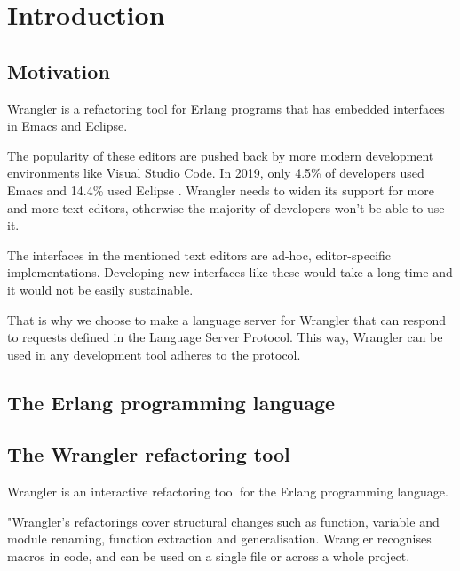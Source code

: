 \chapter{Introduction}
\label{ch:intro}


\section{Motivation}


Wrangler is a refactoring tool for Erlang programs that has embedded interfaces in Emacs and Eclipse.

The popularity of these editors are pushed back by more modern development environments like Visual Studio Code. In 2019, only 4.5\% of developers used Emacs and 14.4\% used Eclipse \cite{DevSurvey}. Wrangler needs to widen its support for more and more text editors, otherwise the majority of developers won’t be able to use it.

The interfaces in the mentioned text editors are ad-hoc, editor-specific implementations. 
Developing new interfaces like these would take a long time and it would not be easily sustainable. 

That is why we choose to make a language server for Wrangler that can respond to requests defined in the Language Server Protocol. This way, Wrangler can be used in any development tool adheres to the protocol.

\section{The Erlang programming language}


\section{The Wrangler refactoring tool}

Wrangler is an interactive refactoring tool for the Erlang programming language.

"Wrangler’s refactorings cover structural changes such as function, variable and module renaming, function extraction and generalisation. Wrangler recognises macros in code, and can be used on a single file or across a whole project.

